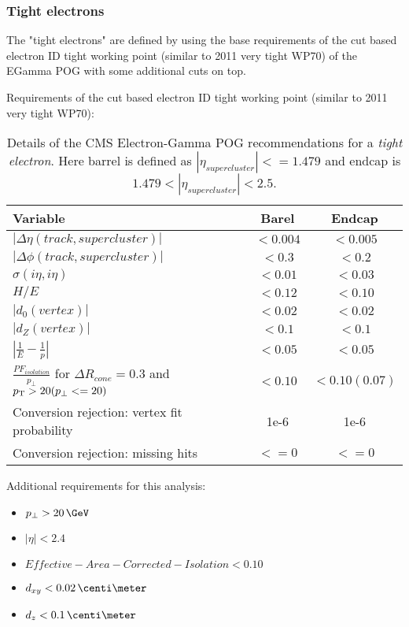 \subsubsection{Tight electrons}
 
The "tight electrons" are defined by using the base requirements of the cut based electron ID tight working point (similar to 2011 very tight WP70) of the EGamma POG with some additional cuts on top.
  
Requirements of the cut based electron ID tight working point (similar to 2011 very tight WP70):

\begin{table}[htp]
  
\begin{tabular}{|l|c|c|}
\hline
Variable & Barel & Endcap \\
\hline\hline
$| \Delta\eta(track,supercluster) |$                           & $<0.004$ & $<0.005$ \\
$| \Delta\phi(track,supercluster) |$                           & $<0.3  $ & $<0.2  $ \\
$ \sigma(i\eta,i\eta)$                                         & $<0.01 $ & $<0.03 $ \\
$H/E$                                                          & $<0.12 $ & $<0.10 $ \\
$|d_{0}(vertex)|$                                              & $<0.02 $ & $<0.02 $ \\
$|d_{Z}(vertex)|$                                              & $<0.1  $ & $<0.1  $ \\
$|\frac{1}{E}-\frac{1}{p}| $                                   & $<0.05 $ & $<0.05 $ \\
$\frac{PF_{isolation}}{p_{\perp}}$ for $ \Delta R_{cone}=0.3$ and $p_{\mathrm{T}} > 20 (p_{\perp} <= 20) $ & $<0.10 $ & $<0.10(0.07)$ \\
Conversion rejection: vertex fit probability                   & 1e-6 & 1e-6 \\
Conversion rejection: missing hits                             & $<=0$ & $<=0$ \\
\hline
\end{tabular}
\caption{Details of the \gls{CMS} Electron-Gamma \gls{POG} recommendations for a \textit{tight electron}. Here barrel is defined as $ |\eta_{supercluster}|<=1.479 $ and endcap is $ 1.479 < |\eta_{supercluster}| < 2.5 $.} 
\end{table}

Additional requirements for this analysis:
\begin{itemize}
  \item $ p_{\perp} > 20\,\GeV$
  \item $ |\eta| < 2.4 $
  \item $ Effective-Area-Corrected-Isolation < 0.10 $
  \item $d_{xy}<0.02\,\centi\meter$
  \item $d_{z} < 0.1\,\centi\meter$
\end{itemize}


